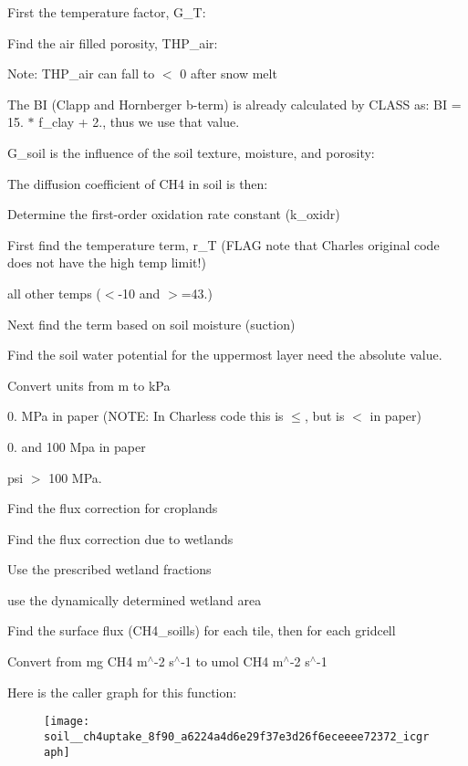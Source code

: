 First the temperature factor, G\+\_\+\+T\+:

Find the air filled porosity, T\+H\+P\+\_\+air\+:

Note\+: T\+H\+P\+\_\+air can fall to $<$ 0 after snow melt

The B\+I (Clapp and Hornberger b-\/term) is already calculated by C\+L\+A\+S\+S as\+: B\+I = 15. $\ast$ f\+\_\+clay + 2., thus we use that value.

G\+\_\+soil is the influence of the soil texture, moisture, and porosity\+:

The diffusion coefficient of C\+H4 in soil is then\+:

Determine the first-\/order oxidation rate constant (k\+\_\+oxidr)

First find the temperature term, r\+\_\+\+T (F\+L\+A\+G note that Charles\textquotesingle{} original code does not have the high temp limit!)

all other temps ($<$-\/10 and $>$=43.)

Next find the term based on soil moisture (suction)

Find the soil water potential for the uppermost layer need the absolute value.

Convert units from m to k\+Pa

0. M\+Pa in paper (N\+O\+T\+E\+: In Charles\textquotesingle{}s code this is $\leq$, but is $<$ in paper)

0. and 100 Mpa in paper

psi $>$ 100 M\+Pa.

Find the flux correction for croplands

Find the flux correction due to wetlands

Use the prescribed wetland fractions

use the dynamically determined wetland area

Find the surface flux (C\+H4\+\_\+soills) for each tile, then for each gridcell

Convert from mg C\+H4 m$^\wedge$-\/2 s$^\wedge$-\/1 to umol C\+H4 m$^\wedge$-\/2 s$^\wedge$-\/1 

Here is the caller graph for this function\+:\nopagebreak
\begin{figure}[H]
\begin{center}
\leavevmode
\texttt{[image: soil\_\_ch4uptake\_8f90\_a6224a4d6e29f37e3d26f6eceeee72372\_icgraph]}
\end{center}
\end{figure}


